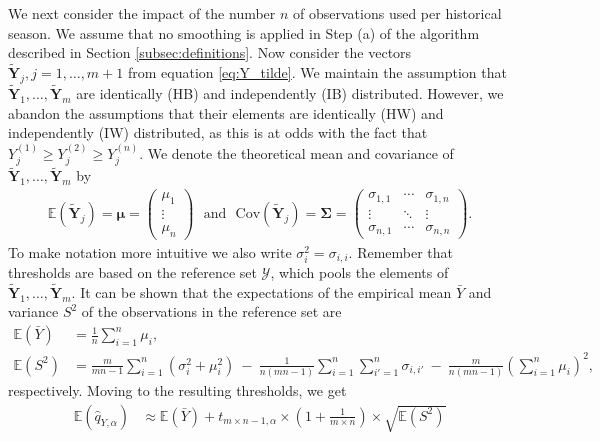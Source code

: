 \documentclass[12pt]{article}
\begin{document}
We next consider the impact of the number $n$ of observations used per historical season. We assume that no smoothing is applied in Step (a) of the algorithm described in Section \ref{subsec:definitions}. Now consider the vectors $\tilde{\mathbf{Y}}_j, j = 1, \dots, m + 1$ from equation \eqref{eq:Y_tilde}. We maintain the assumption that $\tilde{\mathbf{Y}}_1, \dots, \tilde{\mathbf{Y}}_m$ are identically (HB) and independently (IB) distributed. However, we abandon the assumptions that their elements are identically (HW) and independently (IW) distributed, as this is at odds with the fact that $Y_j^{(1)} \geq Y_j^{(2)} \geq Y_j^{(n)}$. We denote the theoretical mean and covariance of $\tilde{\mathbf{Y}}_1, \dots, \tilde{\mathbf{Y}}_m$ by
\begin{align}
\mathbb{E}\left(\tilde{\mathbf{Y}}_j\right) = \boldsymbol{\mu} = \left(\begin{array}{c}
\mu_1\\
\vdots\\
\mu_n
\end{array}\right) \ \ \ \text{and} \ \ \ \text{Cov}\left(\tilde{\mathbf{Y}}_j\right) = \boldsymbol{\Sigma} =
\left(\begin{array}{ccc}
\sigma_{1, 1} & \cdots & \sigma_{1, n}\\
\vdots & \ddots &\vdots\\
\sigma_{n, 1} & \cdots & \sigma_{n, n}
\end{array}\right).
\end{align}
To make notation more intuitive we also write $\sigma^2_i = \sigma_{i, i}$. Remember that thresholds are based on the reference set $\mathcal{Y}$, which pools the elements of $\tilde{\mathbf{Y}}_1, \dots, \tilde{\mathbf{Y}}_m$. It can be shown that the expectations of the empirical mean $\bar{Y}$ and variance $S^2$ of the observations in the reference set are
\begin{align}
\mathbb{E}(\bar{Y}) & = \frac{1}{n} \sum_{i = 1}^n \mu_i,
\label{eq:expectation_mu}\\
\mathbb{E}(S^2) & = \frac{m}{mn - 1} \sum_{i = 1}^n (\sigma_{i}^2 + \mu_i^2) \ - \ \frac{1}{n(mn - 1)} \sum_{i = 1}^n \sum_{i' = 1}^n \sigma_{i,i'} \ - \ \frac{m}{n(mn - 1)}\left(\sum_{i = 1}^n \mu_i\right)^2,
\label{eq:expectation_sigma2}
\end{align}
respectively. Moving to the resulting thresholds, we get
\begin{align}
\mathbb{E}(\hat{q}_{Y, \alpha}) & \approx \mathbb{E}(\bar{Y}) + t_{m\times n - 1, \alpha} \times \left(1 + \frac{1}{m\times n} \right) \times \sqrt{\mathbb{E}(S^2)}
\label{eq:expectation_q}
\end{align}
\end{document}
